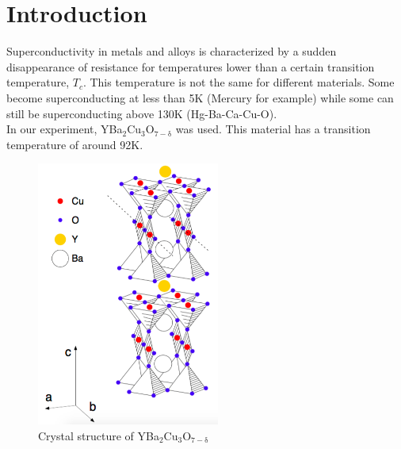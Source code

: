 \documentclass[a4paper,parskip,11pt, DIV12]{scrreprt}
\begin{document}
\fancyfoot{}
\fancyfoot[R]{\small \thepage}
\fancyfoot[L]{}
\fancyfoot[C]{}
\renewcommand{\footrulewidth}{0.4pt} 

\addtolength{\headheight}{2\baselineskip}
\addtolength{\headheight}{0.6pt}


\renewcommand{\headrulewidth}{0.6pt}
\renewcommand{\footrulewidth}{0.4pt}

\renewcommand{\chaptermark}[1]{ \markboth{#1}{} } %


\tableofcontents





\chapter{Introduction}
Superconductivity in metals and alloys is characterized by a sudden disappearance of resistance for temperatures lower than a certain transition temperature, $T_c$. This temperature is not the same for different materials. Some become superconducting at less than 5K (Mercury for example) while some can still be superconducting above 130K (Hg-Ba-Ca-Cu-O). \\
In our experiment, YBa$_2$Cu$_3$O$_{7-\mathrm{\delta}}$ was used. This material has a transition temperature of around 92K.

\begin{figure}[H]
\centering
\includegraphics[width=6cm]{supercond.png}
\caption{Crystal structure of YBa$_2$Cu$_3$O$_{7-\mathrm{\delta}}$}
\end{figure}
\end{document}
